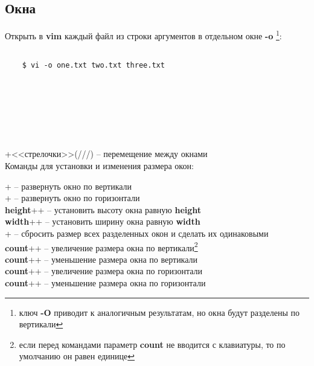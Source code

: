 \subsection*{Окна}

Открыть в \textbf{vim} каждый файл из строки аргументов в отдельном окне \textbf{-o} \footnote{ключ \textbf{-O} приводит к аналогичным результатам, но окна будут разделены по вертикали}:

\begin{lstlisting}
	
	$ vi -o one.txt two.txt three.txt
	
\end{lstlisting}	

\noindent
{}\\
\\
\\
\\
\\
+<<стрелочки>>(\keys{ \arrowkeyup }/\keys{ \arrowkeydown }/\keys{ \arrowkeyleft }/\keys{ \arrowkeyright }) -- перемещение между окнами\\

Команды для установки и изменения размера окон:

\noindent
{}+\keys{\_} -- развернуть окно по вертикали\\
+\keys{|} -- развернуть окно по горизонтали\\
\textbf{height}++\keys{\_} -- установить высоту окна равную \textbf{height}\\
\textbf{width}++\keys{|} -- установить ширину окна равную \textbf{width}\\
+\keys{=} -- сбросить размер всех разделенных окон и сделать их одинаковыми\\

\noindent
\textbf{count}++\keys{+} -- увеличение размера окна по вертикали\footnote{если перед командами параметр \textbf{count} не вводится с клавиатуры, то по умолчанию он равен единице}\\
\textbf{count}++\keys{-} -- уменьшение размера окна по вертикали\\
\textbf{count}++\keys{>} -- увеличение размера окна по горизонтали\\
\textbf{count}++\keys{<} -- уменьшение размера окна по горизонтали\\


